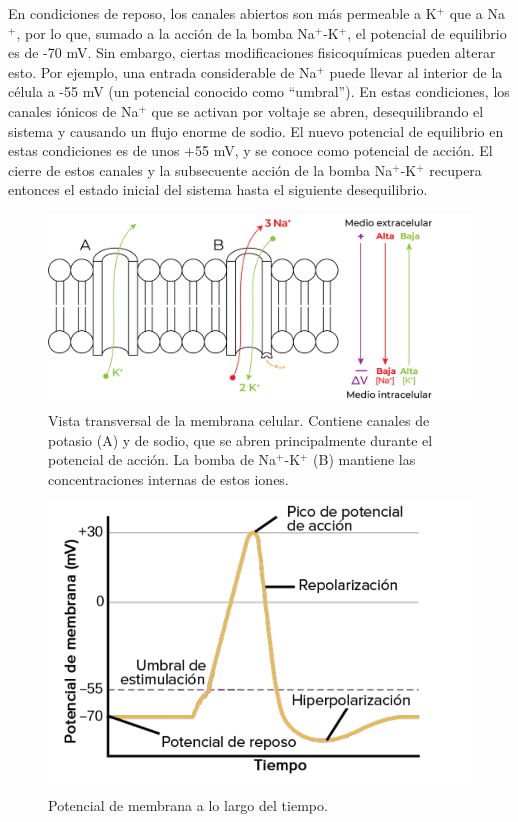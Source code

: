 En condiciones de reposo, los canales abiertos son más permeable a K$^+$ que a Na$^+$, por lo que, sumado a la acción de la bomba Na$^+$-K$^+$, el potencial de equilibrio es de -70 mV. Sin embargo, ciertas modificaciones fisicoquímicas pueden alterar esto. Por ejemplo, una entrada considerable de Na$^+$ puede llevar al interior de la célula a -55 mV (un potencial conocido como \enquote{umbral}). En estas condiciones, los canales iónicos de Na$^+$ que se activan por voltaje se abren, desequilibrando el sistema y causando un flujo enorme de sodio. El nuevo potencial de equilibrio en estas condiciones es de unos +55 mV, y se conoce como potencial de acción. El cierre de estos canales y la subsecuente acción de la bomba Na$^+$-K$^+$ recupera entonces el estado inicial del sistema hasta el siguiente desequilibrio.

\begin{figure}[H]
	\centering

	\includegraphics[width=\linewidth]{media/6-potencial.png}
	\caption{Vista transversal de la membrana celular. Contiene canales de potasio (A) y de sodio, que se abren principalmente durante el potencial de acción. La bomba de Na$^+$-K$^+$ (B) mantiene las concentraciones internas de estos iones.}
	\label{action}
\end{figure}

\begin{figure}[H]
	\centering

	\includegraphics[width=\linewidth]{media/6-potencialgraph.png}
	\caption{Potencial de membrana a lo largo del tiempo.}
	\label{actiongraph}
\end{figure}

